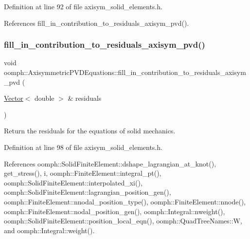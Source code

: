Definition at line 92 of file axisym\+\_\+solid\+\_\+elements.\+h.



References fill\+\_\+in\+\_\+contribution\+\_\+to\+\_\+residuals\+\_\+axisym\+\_\+pvd().

\mbox{\label{classoomph_1_1AxisymmetricPVDEquations_a12f081b16b2f2a9e8409d4ec12a6d071}} 
\subsubsection{\texorpdfstring{fill\+\_\+in\+\_\+contribution\+\_\+to\+\_\+residuals\+\_\+axisym\+\_\+pvd()}{fill\_in\_contribution\_to\_residuals\_axisym\_pvd()}}
{\footnotesize\ttfamily void oomph\+::\+Axisymmetric\+P\+V\+D\+Equations\+::fill\+\_\+in\+\_\+contribution\+\_\+to\+\_\+residuals\+\_\+axisym\+\_\+pvd (\begin{DoxyParamCaption}\item[{\hyperlink{classoomph_1_1Vector}{Vector}$<$ double $>$ \&}]{residuals }\end{DoxyParamCaption})\hspace{0.3cm}{\ttfamily [inline]}}



Return the residuals for the equations of solid mechanics. 



Definition at line 98 of file axisym\+\_\+solid\+\_\+elements.\+h.



References oomph\+::\+Solid\+Finite\+Element\+::dshape\+\_\+lagrangian\+\_\+at\+\_\+knot(), get\+\_\+stress(), i, oomph\+::\+Finite\+Element\+::integral\+\_\+pt(), oomph\+::\+Solid\+Finite\+Element\+::interpolated\+\_\+xi(), oomph\+::\+Solid\+Finite\+Element\+::lagrangian\+\_\+position\+\_\+gen(), oomph\+::\+Finite\+Element\+::nnodal\+\_\+position\+\_\+type(), oomph\+::\+Finite\+Element\+::nnode(), oomph\+::\+Finite\+Element\+::nodal\+\_\+position\+\_\+gen(), oomph\+::\+Integral\+::nweight(), oomph\+::\+Solid\+Finite\+Element\+::position\+\_\+local\+\_\+eqn(), oomph\+::\+Quad\+Tree\+Names\+::W, and oomph\+::\+Integral\+::weight().



